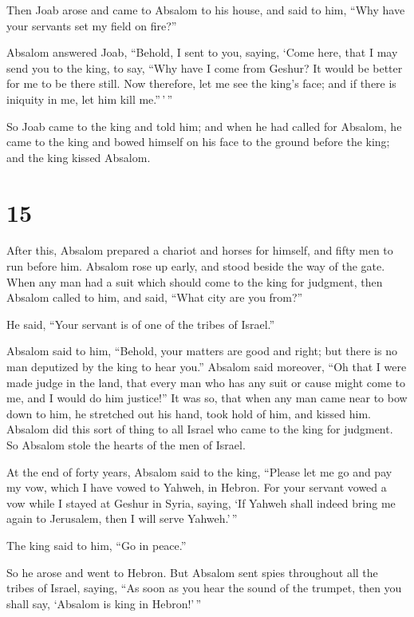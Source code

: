  Then Joab arose and came to Absalom to his house, and said
to him, ``Why have your servants set my field on fire?''

 Absalom answered Joab, ``Behold, I sent to you, saying,
`Come here, that I may send you to the king, to say, ``Why have I come
from Geshur? It would be better for me to be there still. Now therefore,
let me see the king's face; and if there is iniquity in me, let him kill
me.''\,'\,''

 So Joab came to the king and told him; and when he had
called for Absalom, he came to the king and bowed himself on his face to
the ground before the king; and the king kissed Absalom.

\hypertarget{section-14}{%
\section{15}\label{section-14}}

 After this, Absalom prepared a chariot and horses for
himself, and fifty men to run before him.  Absalom rose up
early, and stood beside the way of the gate. When any man had a suit
which should come to the king for judgment, then Absalom called to him,
and said, ``What city are you from?''

He said, ``Your servant is of one of the tribes of Israel.''

 Absalom said to him, ``Behold, your matters are good and
right; but there is no man deputized by the king to hear you.''
 Absalom said moreover, ``Oh that I were made judge in the
land, that every man who has any suit or cause might come to me, and I
would do him justice!''  It was so, that when any man came
near to bow down to him, he stretched out his hand, took hold of him,
and kissed him.  Absalom did this sort of thing to all
Israel who came to the king for judgment. So Absalom stole the hearts of
the men of Israel.

 At the end of forty years, Absalom said to the king,
``Please let me go and pay my vow, which I have vowed to Yahweh, in
Hebron.  For your servant vowed a vow while I stayed at
Geshur in Syria, saying, `If Yahweh shall indeed bring me again to
Jerusalem, then I will serve Yahweh.'\,''

 The king said to him, ``Go in peace.''

So he arose and went to Hebron.  But Absalom sent spies
throughout all the tribes of Israel, saying, ``As soon as you hear the
sound of the trumpet, then you shall say, `Absalom is king in
Hebron!'\,''


